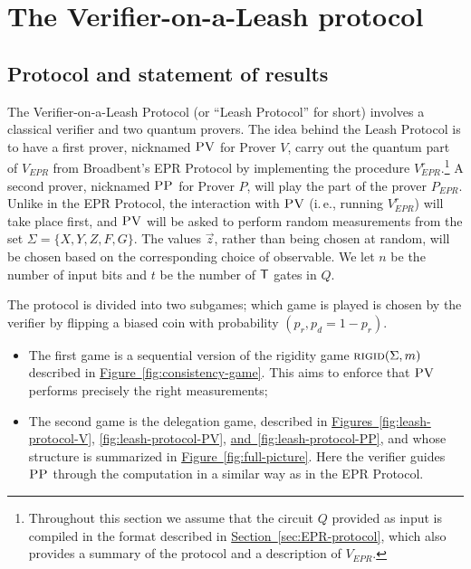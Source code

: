 \documentclass[11pt]{article}
\numberwithin{equation}{section}
\theoremstyle{definition}
\theoremstyle{plain}
\newcommand{\ie}{i.\,e.}
\newcommand{\expref}[2]{\hyperref[#2]{#1~\ref{#2}}}
\newcommand{\rigid}{\textsc{rigid}}
\newcommand{\pv}{\textsc{PV}}
\newcommand{\pp}{\textsc{PP}}
\begin{document}
 

\section{The Verifier-on-a-Leash protocol}   %
\label{sec:leash}





\subsection{Protocol and statement of results}
\label{sec:leash subsec}

The Verifier-on-a-Leash Protocol (or ``Leash Protocol'' for short) involves a classical verifier and two quantum provers.
The idea behind the Leash Protocol is to have a first prover, nicknamed $\pv$ for Prover $V$, carry out the quantum part of $V_{EPR}$ from Broadbent's EPR Protocol by implementing the procedure $V_{EPR}^r$.\footnote{Throughout this section we assume that the circuit $Q$ provided as input is compiled in the format described in \expref{Section}{sec:EPR-protocol}, which also provides a summary of the protocol and a description of $V_{EPR}$.} A second prover, nicknamed $\pp$ for Prover $P$, will play the part of the prover $P_{EPR}$. Unlike in the EPR Protocol, the interaction with $\pv$ (\ie, running $V_{EPR}^r$) will take place {first}, and $\pv$ will be asked to perform {random} measurements from the set $\Sigma = \{X,Y,Z,F,G\}$. The values $\vec{z}$, rather than being chosen at random, will be chosen based on the corresponding choice of observable. We let $n$ be the number of input bits and $t$ be the number of $\sf T$ gates in $Q$. 

The protocol is divided into two subgames; which game is played is chosen by the verifier by flipping a biased coin with probability $(p_r,p_d=1-p_r)$.
\begin{itemize}[nolistsep]
\item The first game is a sequential version of the rigidity game $\rigid(\Sigma,m)$ described in \expref{Figure}{fig:consistency-game}. This aims to enforce that $\pv$ performs precisely the right measurements;

\item The second game is the delegation game, described in \expref{Figures}{fig:leash-protocol-V}, \ref{fig:leash-protocol-PV}, \expref{and}{fig:leash-protocol-PP}, and whose structure is summarized in \expref{Figure}{fig:full-picture}. Here the verifier guides $\pp$ through the computation in a similar way as in the EPR Protocol.
\end{itemize}
\end{document}

